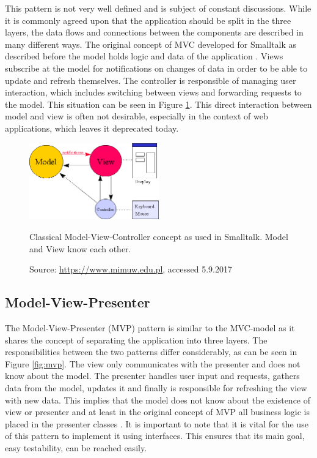 This pattern is not very well defined and is subject of constant discussions. While it is commonly agreed upon that the application should be split in the three layers, the data flows and connections between the components are described in many different ways. The original concept of MVC developed for Smalltalk as described before the model holds logic and data of the application \cite[p.4]{gof}. Views subscribe at the model for notifications on changes of data in order to be able to update and refresh themselves. The controller is responsible of managing user interaction, which includes switching between views and forwarding requests to the model. This situation can be seen in Figure \ref{fig:mvc-smalltalk}. This direct interaction between model and view is often not desirable, especially in the context of web applications, which leaves it deprecated today. 

\begin{figure}[htbp]
	\centering

	
	\includegraphics[width=0.5\textwidth]{./content/pictures/mvc-smalltalk.jpg}
	\caption{Classical Model-View-Controller concept as used in Smalltalk. Model and View know each other.}
	\label{fig:mvc-smalltalk}
	\caption*{Source: \href{https://www.mimuw.edu.pl/\~sl/teaching/00\_01/Delfin\_EC/Overviews/MVC.htm}{https://www.mimuw.edu.pl}, accessed 5.9.2017}
\end{figure}

\subsection{Model-View-Presenter}
The Model-View-Presenter (MVP) pattern is similar to the MVC-model as it shares the concept of separating the application into three layers. The responsibilities between the two patterns differ considerably, as can be seen in Figure \ref{fig:mvp}. The view only communicates with the presenter and does not know about the model. The presenter handles user input and requests, gathers data from the model, updates it and finally is responsible for refreshing the view with new data. This implies that the model does not know about the existence of view or presenter and at least in the original concept of MVP all business logic is placed in the presenter classes \cite{mvp}. It is important to note that it is vital for the use of this pattern to implement it using interfaces. This ensures that its main goal, easy testability, can be reached easily. 

